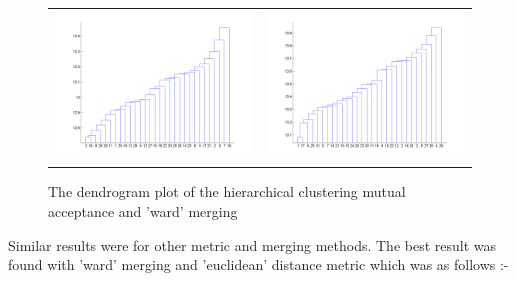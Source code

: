 \documentclass[11pt]{report}
\begin{document}
\begin{figure}[H]
\begin{tabular}{cc}
\includegraphics[scale=0.3]{dendo_distance_chase.png} &
\includegraphics[scale=0.3]{dendo_distance_coax.png}
\end{tabular}
\caption{The dendrogram plot of the hierarchical clustering mutual acceptance and 'ward' merging}
\end{figure}
Similar results were for other metric and merging methods. The best result was found with 'ward' merging and 'euclidean' distance metric which was as follows :-
\end{document}
